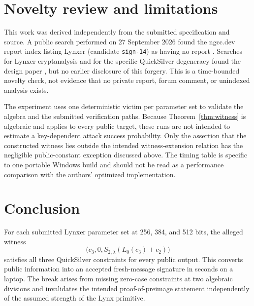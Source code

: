 \documentclass[11pt,a4paper]{article}
\begin{document}
\section{Novelty review and limitations}

This work was derived independently from the submitted specification and source.  A public
search performed on 27 September 2026 found the ngcc.dev report index listing Lynxer
(candidate \texttt{sign-14}) as having no report \cite{ngccreports}.  Searches for Lynxer
cryptanalysis and for the specific QuickSilver degeneracy found the design paper
\cite{lynxeprint}, but no earlier disclosure of this forgery.  This is a time-bounded novelty
check, not evidence that no private report, forum comment, or unindexed analysis exists.

The experiment uses one deterministic victim per parameter set to validate the algebra and
the submitted verification paths.  Because Theorem~\ref{thm:witness} is algebraic and applies
to every public target, these runs are not intended to estimate a key-dependent attack success
probability.  Only the assertion that the constructed witness lies outside the intended
witness-extension relation has the negligible public-constant exception discussed above.  The
timing table is specific to one portable Windows build and should not be read as a performance
comparison with the authors' optimized implementation.

\section{Conclusion}

For each submitted Lynxer parameter set at 256, 384, and 512 bits, the alleged witness
\[
  \bigl(c_3,0,S_{2,\lambda}(L_0(c_3)+c_2)\bigr)
\]
satisfies all three QuickSilver constraints for every public output.  This converts public information into an accepted fresh-message signature in seconds on a
laptop.  The break arises from missing zero-case constraints at two algebraic divisions and invalidates
the intended proof-of-preimage statement independently of the assumed strength of the Lynx
primitive.
\end{document}
